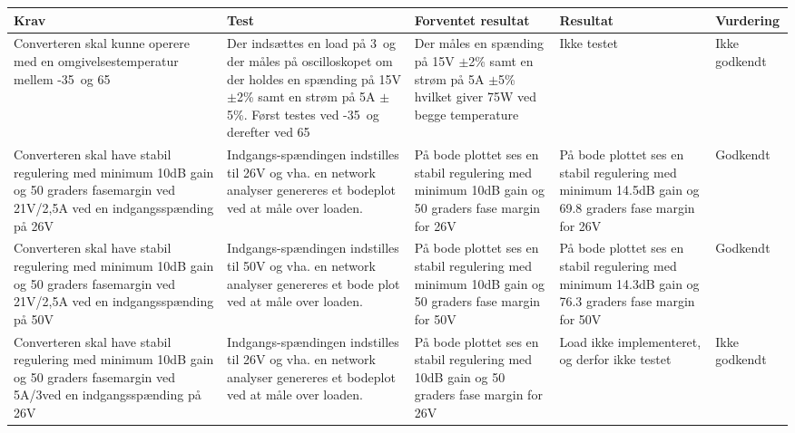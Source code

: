 \begin{tabularx}{\textwidth}{|X|X|X|X|X|}
	\hline
	\textbf{Krav} & \textbf{Test} & \textbf{Forventet resultat} & \textbf{Resultat} & \textbf{Vurdering} \\ \hline
	Converteren skal kunne operere med en omgivelsestemperatur mellem -35\degreeCelsius\ og 65\degreeCelsius\ & Der indsættes en load på 3\ohm\ og der måles på oscilloskopet om der holdes en spænding på 15V $\pm$2\% samt en strøm på 5A $\pm$5\%. Først testes ved -35\degreeCelsius\ og derefter ved 65\degreeCelsius\ & Der måles en spænding på 15V $\pm$2\% samt en strøm på 5A $\pm$5\% hvilket giver 75W ved begge temperature &Ikke testet&  Ikke godkendt \\ \hline
	Converteren skal have stabil regulering med minimum 10dB gain og 50 graders fasemargin ved 21V/2,5A ved en indgangsspænding på 26V & Indgangs-spændingen indstilles til 26V og vha. en network analyser genereres et bodeplot ved at måle over loaden.& På bode plottet ses en stabil regulering med minimum 10dB gain og 50 graders fase margin for 26V & På bode plottet ses en stabil regulering med minimum 14.5dB gain og 69.8 graders fase margin for 26V & Godkendt \\ \hline
	Converteren skal have stabil regulering med minimum 10dB gain og 50 graders fasemargin ved 21V/2,5A ved en indgangsspænding på 50V & Indgangs-spændingen indstilles til 50V og vha. en network analyser genereres et bode plot ved at måle over loaden. & På bode plottet ses en stabil regulering med minimum 10dB gain og 50 graders fase margin for 50V & På bode plottet ses en stabil regulering med minimum 14.3dB gain og 76.3 graders fase margin for 50V & Godkendt \\ \hline
	Converteren skal have stabil regulering med minimum 10dB gain og 50 graders fasemargin ved 5A/3\ohm ved en indgangsspænding på 26V & Indgangs-spændingen indstilles til 26V og vha. en network analyser genereres et bodeplot ved at måle over loaden.& På bode plottet ses en stabil regulering med 10dB gain og 50 graders fase margin for 26V & Load ikke implementeret, og derfor ikke testet & Ikke godkendt \\ \hline		
\end{tabularx}


